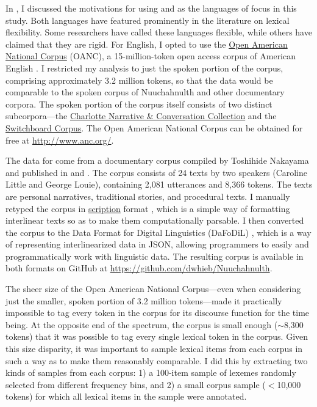 In , I discussed the motivations for using  and  as the languages of focus in this study. Both languages have featured prominently in the literature on lexical flexibility. Some researchers have called these languages flexible, while others have claimed that they are rigid. For English, I opted to use the \href{http://www.anc.org/}{Open American National Corpus} (OANC), a 15-million-token open access corpus of American English \parencite{OANC}. I restricted my analysis to just the spoken portion of the corpus, comprising approximately 3.2 million tokens, so that the data would be comparable to the spoken corpus of Nuuchahnulth and other documentary corpora. The spoken portion of the corpus itself consists of two distinct subcorpora—the \href{https://newsouthvoices.uncc.edu/}{Charlotte Narrative \& Conversation Collection}  and the \href{https://catalog.ldc.upenn.edu/LDC97S62}{Switchboard Corpus}. The Open American National Corpus can be obtained for free at \url{http://www.anc.org/}.

The data for  come from a documentary corpus compiled by Toshihide Nakayama and published in \textcite{Little2003} and \textcite{Louie2003}. The corpus consists of 24 texts by two speakers (Caroline Little and George Louie), containing 2,081 utterances and 8,366 tokens. The texts are personal narratives, traditional stories, and procedural texts. I manually retyped the corpus in \href{https://scription.digitallinguistics.io}{scription} format \parencite{Hieber2021b}, which is a simple way of formatting interlinear texts so as to make them computationally parsable. I then converted the corpus to the Data Format for Digital Linguistics (DaFoDiL) \parencite{Hieber2021a}, which is a way of representing interlinearized data in JSON, allowing programmers to easily and programmatically work with linguistic data. The resulting corpus is available in both formats on GitHub at \url{https://github.com/dwhieb/Nuuchahnulth}.

The sheer size of the Open American National Corpus—even when considering just the smaller, spoken portion of 3.2 million tokens—made it practically impossible to tag every token in the corpus for its discourse function for the time being. At the opposite end of the spectrum, the  corpus is small enough ($\sim$8,300 tokens) that it was possible to tag every single lexical token in the corpus. Given this size disparity, it was important to sample lexical items from each corpus in such a way as to make them reasonably comparable. I did this by extracting two kinds of samples from each corpus: 1) a 100-item sample of lexemes randomly selected from different frequency bins, and 2) a small corpus sample ($<$10,000 tokens) for which all lexical items in the sample were annotated.

